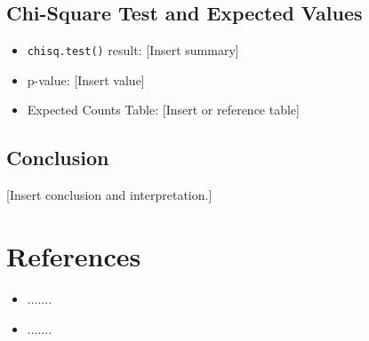 \documentclass{article}
\begin{document}
\subsection{Chi-Square Test and Expected Values}
\begin{itemize}
    \item \texttt{chisq.test()} result: [Insert summary]
    \item p-value: [Insert value]
    \item Expected Counts Table: [Insert or reference table]
\end{itemize}

\subsection{Conclusion}
[Insert conclusion and interpretation.]

\section{References}
\begin{itemize}
    \item ....... 
    \item .......
\end{itemize}
\end{document}
